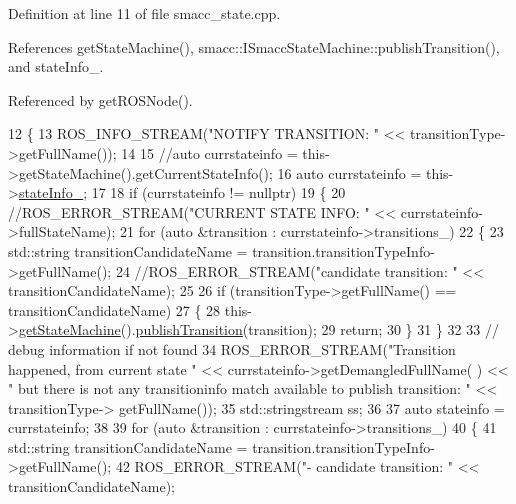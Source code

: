 Definition at line 11 of file smacc\+\_\+state.\+cpp.



References get\+State\+Machine(), smacc\+::\+I\+Smacc\+State\+Machine\+::publish\+Transition(), and state\+Info\+\_\+.



Referenced by get\+R\+O\+S\+Node().


\begin{DoxyCode}
12 \{
13     ROS\_INFO\_STREAM(\textcolor{stringliteral}{"NOTIFY TRANSITION: "} << transitionType->getFullName());
14 
15     \textcolor{comment}{//auto currstateinfo = this->getStateMachine().getCurrentStateInfo();}
16     \textcolor{keyword}{auto} currstateinfo = this->\hyperlink{classsmacc_1_1ISmaccState_af20df2cfd3aa826fe02a3d703dc63c1b}{stateInfo\_};
17 
18     \textcolor{keywordflow}{if} (currstateinfo != \textcolor{keyword}{nullptr})
19     \{
20         \textcolor{comment}{//ROS\_ERROR\_STREAM("CURRENT STATE INFO: " << currstateinfo->fullStateName);}
21         \textcolor{keywordflow}{for} (\textcolor{keyword}{auto} &transition : currstateinfo->transitions\_)
22         \{
23             std::string transitionCandidateName = transition.transitionTypeInfo->getFullName();
24             \textcolor{comment}{//ROS\_ERROR\_STREAM("candidate transition: " << transitionCandidateName);}
25 
26             \textcolor{keywordflow}{if} (transitionType->getFullName() == transitionCandidateName)
27             \{
28                 this->\hyperlink{classsmacc_1_1ISmaccState_a562bb3f9a3ac16b8be71e4794c9e7523}{getStateMachine}().\hyperlink{classsmacc_1_1ISmaccStateMachine_a06cc53c282c93692829b6efd28e315f4}{publishTransition}(transition);
29                 \textcolor{keywordflow}{return};
30             \}
31         \}
32 
33         \textcolor{comment}{// debug information if not found}
34         ROS\_ERROR\_STREAM(\textcolor{stringliteral}{"Transition happened, from current state "} << currstateinfo->getDemangledFullName(
      ) << \textcolor{stringliteral}{" but there is not any transitioninfo match available to publish transition: "} << transitionType->
      getFullName());
35         std::stringstream ss;
36 
37         \textcolor{keyword}{auto} stateinfo = currstateinfo;
38 
39         \textcolor{keywordflow}{for} (\textcolor{keyword}{auto} &transition : currstateinfo->transitions\_)
40         \{
41             std::string transitionCandidateName = transition.transitionTypeInfo->getFullName();
42             ROS\_ERROR\_STREAM(\textcolor{stringliteral}{"- candidate transition: "} << transitionCandidateName);

\end{DoxyCode}
